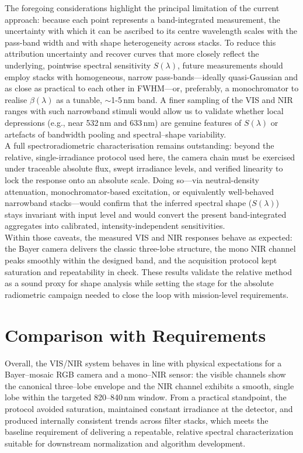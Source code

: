 \noindent
The foregoing considerations highlight the principal limitation of the current approach: because each point represents a band-integrated measurement, the uncertainty with which it can be ascribed to its centre wavelength scales with the pass-band width and with shape heterogeneity across stacks. To reduce this attribution uncertainty and recover curves that more closely reflect the underlying, pointwise spectral sensitivity $S(\lambda)$, future measurements should employ stacks with homogeneous, narrow pass-bands—ideally quasi-Gaussian and as close as practical to each other in FWHM—or, preferably, a monochromator to realise $\beta(\lambda)$ as a tunable, $\sim$1-5\,nm band. A finer sampling of the VIS and NIR ranges with such narrowband stimuli would allow us to validate whether local depressions (e.g., near 532\,nm and 633\,nm) are genuine features of $S(\lambda)$ or artefacts of bandwidth pooling and spectral–shape variability.\\

\noindent
A full spectroradiometric characterisation remains outstanding: beyond the relative, single-irradiance protocol used here, the camera chain must be exercised under traceable absolute flux, swept irradiance levels, and verified linearity to lock the response onto an absolute scale. Doing so—via neutral-density attenuation, monochromator-based excitation, or equivalently well-behaved narrowband stacks—would confirm that the inferred spectral shape ($S(\lambda)$) stays invariant with input level and would convert the present band-integrated aggregates into calibrated, intensity-independent sensitivities.\\

\noindent
Within those caveats, the measured VIS and NIR responses behave as expected: the Bayer camera delivers the classic three-lobe structure, the mono NIR channel peaks smoothly within the designed band, and the acquisition protocol kept saturation and repeatability in check. These results validate the relative method as a sound proxy for shape analysis while setting the stage for the absolute radiometric campaign needed to close the loop with mission-level requirements.\\


\section{Comparison with Requirements}
\label{sec:synthesis_requirements}

\noindent
Overall, the VIS/NIR system behaves in line with physical expectations for a Bayer–mosaic RGB camera and a mono–NIR sensor: the visible channels show the canonical three–lobe envelope and the NIR channel exhibits a smooth, single lobe within the targeted 820–840\,nm window. From a practical standpoint, the protocol avoided saturation, maintained constant irradiance at the detector, and produced internally consistent trends across filter stacks, which meets the baseline requirement of delivering a repeatable, relative spectral characterization suitable for downstream normalization and algorithm development.\\

